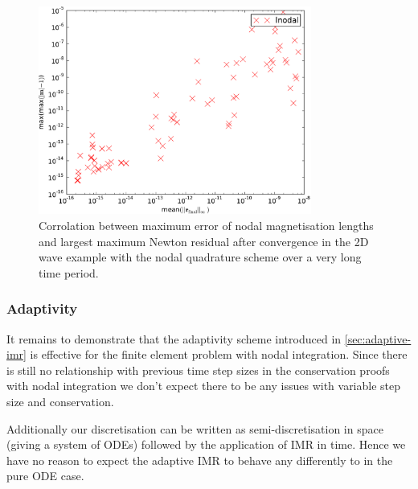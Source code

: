 \begin{figure}[ht!]
  \centering
  \includegraphics[width=0.8\textwidth]
  {plots/2d_wave_solution_m_length_newton_res/-maxmaxmathbfm-1vsmeanmathbfr_mathrmfinal_infty.pdf}
  \caption{Corrolation between maximum error of nodal magnetisation lengths and largest maximum Newton residual after convergence in the 2D wave example with the nodal quadrature scheme over a very long time period.}
  \label{fig:mean-ml-error-2d-nodal-newton-tests}
\end{figure}


\subsubsection{Adaptivity}

It remains to demonstrate that the adaptivity scheme introduced in \autoref{sec:adaptive-imr} is effective for the finite element problem with nodal integration.
Since there is still no relationship with previous time step sizes in the conservation proofs with nodal integration we don't expect there to be any issues with variable step size and conservation.

Additionally our discretisation can be written as semi-discretisation in space (giving a system of ODEs) followed by the application of IMR in time.
Hence we have no reason to expect the adaptive IMR to behave any differently to in the pure ODE case.






